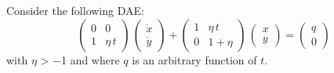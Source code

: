 Consider the following DAE:
\begin{equation*}
	\begin{pmatrix}
		0 & 0\\
		1 & \eta\,t 
	\end{pmatrix} \, \begin{pmatrix}
		\dot x \\
		\dot y
	\end{pmatrix} + 
	\begin{pmatrix}
		1 & \eta\,t \\
		0 & 1 + \eta
	\end{pmatrix} \,
	\begin{pmatrix}
		x \\
		y
	\end{pmatrix} =
	\begin{pmatrix}
		q \\
		0
	\end{pmatrix}
\end{equation*}
with $\eta$ > −1 and where $q$ is an arbitrary function of $t$.

